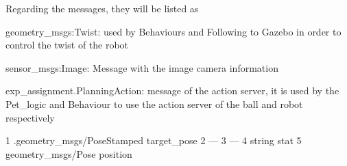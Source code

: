 Regarding the messages, they will be listed as
\begin{DoxyItemize}
\item geometry\+\_\+msgs\+:\+Twist\+: used by Behaviours and Following to Gazebo in order to control the twist of the robot
\item sensor\+\_\+msgs\+:\+Image\+: Message with the image camera information
\item exp\+\_\+assignment.\+Planning\+Action\+: message of the action server, it is used by the Pet\+\_\+logic and Behaviour to use the action server of the ball and robot respectively 
\begin{DoxyCode}
1 .geometry\_msgs/PoseStamped target\_pose
2 ---
3 ---
4 string stat
5 geometry\_msgs/Pose position
\end{DoxyCode}

\end{DoxyItemize}

